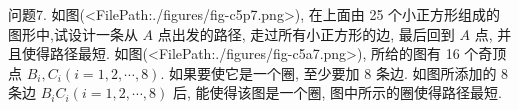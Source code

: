 问题7. 如图(<FilePath:./figures/fig-c5p7.png>), 在上面由 25 个小正方形组成的图形中,试设计一条从 $A$ 点出发的路径, 走过所有小正方形的边, 最后回到 $A$ 点, 并且使得路径最短.
如图(<FilePath:./figures/fig-c5a7.png>), 所给的图有 16 个奇顶点 $B_i, C_i(i=1,2, \cdots, 8)$. 如果要使它是一个圈, 至少要加 8 条边.
如图所添加的 8 条边 $B_i C_i(i=1,2, \cdots, 8)$ 后, 能使得该图是一个圈, 图中所示的圈使得路径最短.


